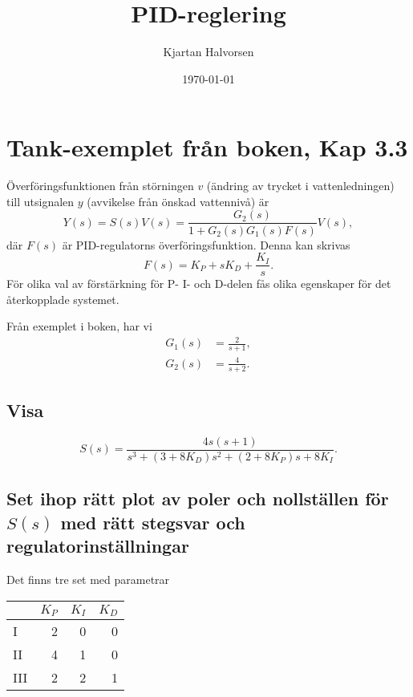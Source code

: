 \documentclass{scrartcl}
\title{PID-reglering}
\author{Kjartan Halvorsen}
\date{\today}
\newcommand*{\vsp}[1]{\rule{0pt}{#1}}
\begin{document}
\maketitle


\section{Tank-exemplet från boken, Kap 3.3}
\label{sec-1}

  Överföringsfunktionen från störningen $v$ (ändring av trycket i vattenledningen) till utsignalen $y$ (avvikelse från önskad vattennivå) är
\[ Y(s) = S(s) V(s) = \frac{G_2(s)}{1 + G_2(s)G_1(s)F(s)} V(s), \]
där $F(s)$ är PID-regulatorns överföringsfunktion. Denna kan skrivas
\[ F(s) = K_P + sK_D + \frac{K_I}{s}. \]
För olika val av förstärkning för P- I- och D-delen fås olika egenskaper för det återkopplade systemet.

Från exemplet i boken, har vi 
\begin{align*}
G_1(s) &= \frac{2}{s+1},\\
G_2(s) &= \frac{4}{s+2}.
\end{align*}
\subsection{Visa}
\label{sec-1-1}

\[ S(s) = \frac{4s(s+1)}{s^3 + (3+8K_D)s^2  + (2+8K_P)s + 8K_I}. \]
\vsp{4cm}
\subsection{Set ihop rätt plot av poler och nollställen för $S(s)$ med rätt stegsvar och regulatorinställningar}
\label{sec-1-2}

Det finns tre set med parametrar

\begin{center}
\begin{tabular}{lrrr}
      &  $K_P$  &  $K_I$  &  $K_D$  \\
\hline
 I    &      2  &      0  &      0  \\
\hline
 II   &      4  &      1  &      0  \\
\hline
 III  &      2  &      2  &      1  \\
\hline
\end{tabular}
\end{center}
\end{document}
